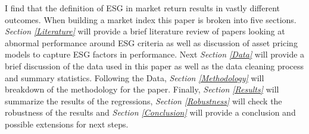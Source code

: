 I find that the definition of ESG in market return results in vastly different outcomes. When building a market index 
this paper is broken into five sections. \textit{Section \ref{Literature}} will provide a  brief literature review of papers looking at abnormal performance around ESG criteria as well as discussion of asset pricing models to capture ESG factors in performance. Next \textit{ Section \ref{Data}}  will provide a brief discussion of the data used in this paper as well as the data cleaning process and summary statistics. Following the Data, \textit{Section \ref{Methodology}} will breakdown of the methodology for the paper. Finally, \textit{Section \ref{Results}}  will summarize the results of the regressions, \textit{Section \ref{Robustness}} will check the robustness of the results and \textit{Section \ref{Conclusion}} will provide a conclusion and possible extensions for next steps. 